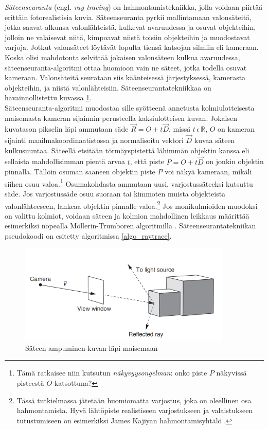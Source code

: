 \documentclass[a4paper, 12pt, titlepage]{article}
\newcommand{\R}{\mathbb{R}}
\begin{document}
\emph{Säteenseuranta} (engl. \emph{ray tracing}) on hahmontamistekniikka, jolla voidaan piirtää erittäin fotorealistisia kuvia. Säteenseuranta pyrkii mallintamaan valonsäteitä, jotka saavat alkunsa valonlähteistä, kulkevat avaruudessa ja osuvat objekteihin, jolloin ne valaisevat niitä, kimpoavat niistä toisiin objekteihin ja muodostavat varjoja. Jotkut valonsäteet löytävät lopulta tiensä katsojan silmiin eli kameraan. Koska olisi mahdotonta selvittää jokaisen valonsäteen kulkua avaruudessa, säteenseuranta-algoritmi ottaa huomioon vain ne säteet, jotka todella osuvat kameraan. Valonsäteitä seurataan siis käänteisessä järjestyksessä, kamerasta objekteihin, ja niistä valonlähteisiin. \citep[.]{janke} Säteenseurantatekniikkaa on havainnollistettu kuvassa \ref{raytracing}.\\

Säteenseuranta-algoritmi muodostaa sille syötteenä annetusta kolmiulotteisesta maisemasta kameran sijainnin perusteella kaksiulotteisen kuvan. Jokaisen kuvatason pikselin läpi ammutaan säde $\vec{R}=O+t\vec{D}$, missä $t\,\epsilon\,\R$, $O$ on kameran sijainti maailmakoordinaatistossa ja normalisoitu vektori $\vec{D}$ kuvaa säteen kulkusuuntaa. Säteellä etsitään törmäyspistettä lähimmän objektin kanssa eli sellaista mahdollisimman pientä arvoa $t$, että piste $P=O+t\vec{D}$ on jonkin objektin pinnalla. Tällöin osuman saaneen objektin piste $P$ voi näkyä kameraan, mikäli siihen osuu valoa.\footnote{Tämä ratkaisee niin kutsutun \emph{näkyvyysongelman}: onko piste $P$ näkyvissä pisteestä $O$ katsottuna?} Osumakohdasta ammutaan uusi, varjostussäteeksi kutsuttu säde. Jos varjostussäde osuu suoraan tai kimmoten muista objekteista valonlähteeseen, lankeaa objektin pinnalle valoa.\footnote{Tässä tutkielmassa jätetään huomiomatta varjostus, joka on oleellinen osa hahmontamista. Hyvä lähtöpiste realistiseen varjostukseen ja valaistukseen tutustumiseen on esimerkiksi James Kajiyan hahmontamisyhtälö \citep[ks.][]{kajiya}.}  \citep[.]{janke} Jos monikulmioiden muodoksi on valittu kolmiot, voidaan säteen ja kolmion mahdollinen leikkaus määrittää esimerkiksi nopealla Möllerin-Trumboren algoritmilla \citep[ks.][]{moller}. Säteenseurantatekniikan pseudokoodi on esitetty algoritmissa \ref{algo_raytrace}.\\


\begin{figure}
 \centering 
 \includegraphics[width=0.9\textwidth]{img/raytracing.png}
 \vspace{0.4cm}
 \caption{Säteen ampuminen kuvan läpi maisemaan \citep{janke}}
 \label{raytracing}
\end{figure}
\end{document}
